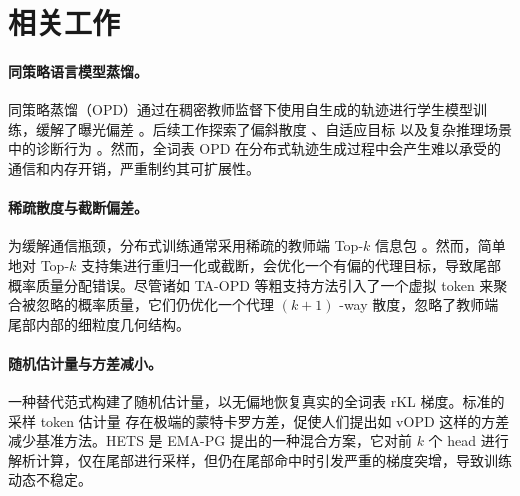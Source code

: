 \section{相关工作}

\paragraph{同策略语言模型蒸馏。}
同策略蒸馏（OPD）通过在稠密教师监督下使用自生成的轨迹进行学生模型训练，缓解了曝光偏差 \citep{gu2024minillm,agarwal2024policy}。后续工作探索了偏斜散度 \citep{ko2024distillm}、自适应目标 \citep{jang2026stable,heo2026policy,jin2026entropy} 以及复杂推理场景中的诊断行为 \citep{fu2026revisiting,zhu2026many}。然而，全词表 OPD 在分布式轨迹生成过程中会产生难以承受的通信和内存开销，严重制约其可扩展性。
\vspace{-4mm}
\paragraph{稀疏散度与截断偏差。}
为缓解通信瓶颈，分布式训练通常采用稀疏的教师端 Top-$k$ 信息包 \citep{zhu2026many}。然而，简单地对 Top-$k$ 支持集进行重归一化或截断，会优化一个有偏的代理目标，导致尾部概率质量分配错误。尽管诸如 TA-OPD \citep{huang2026tail} 等粗支持方法引入了一个虚拟 token \citep{anshumann-etal-2025-sparse} 来聚合被忽略的概率质量，它们仍优化一个代理 $(k+1)$ -way 散度，忽略了教师端尾部内部的细粒度几何结构。
\vspace{-4mm}
\paragraph{随机估计量与方差减小。}
一种替代范式构建了随机估计量，以无偏地恢复真实的全词表 rKL 梯度。标准的采样 token 估计量 \citep{gu2024minillm,lu2025onpolicydistillation} 存在极端的蒙特卡罗方差，促使人们提出如 vOPD \citep{oh2026kl} 这样的方差减少基准方法。HETS 是 EMA-PG \citep{zhang2026ema} 提出的一种混合方案，它对前 $k$ 个 head 进行解析计算，仅在尾部进行采样，但仍在尾部命中时引发严重的梯度突增，导致训练动态不稳定。
